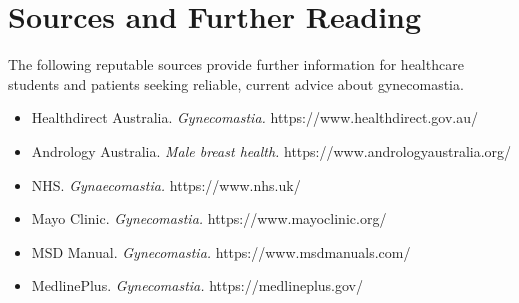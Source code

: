 \section*{Sources and Further Reading}
The following reputable sources provide further information for healthcare students and patients seeking reliable, current advice about gynecomastia.

\begin{itemize}
    \item Healthdirect Australia. \textit{Gynecomastia.} https://www.healthdirect.gov.au/
    \item Andrology Australia. \textit{Male breast health.} https://www.andrologyaustralia.org/
    \item NHS. \textit{Gynaecomastia.} https://www.nhs.uk/
    \item Mayo Clinic. \textit{Gynecomastia.} https://www.mayoclinic.org/
    \item MSD Manual. \textit{Gynecomastia.} https://www.msdmanuals.com/
    \item MedlinePlus. \textit{Gynecomastia.} https://medlineplus.gov/
\end{itemize}
